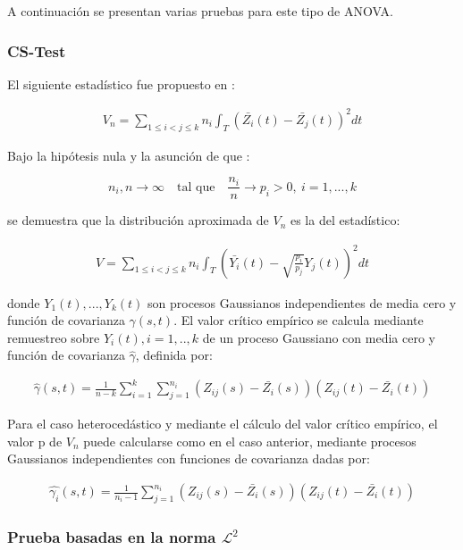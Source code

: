\documentclass[
]{book}
\begin{document}
A continuación se presentan varias pruebas para este tipo de ANOVA.

\hypertarget{cs-test}{%
\subsubsection*{CS-Test}\label{cs-test}}

El siguiente estadístico fue propuesto en \citep{cuevas}:

\begin{align*}
    V_n=\sum_{1\leq i<j\leq k} n_i\int_T (\bar{Z_i}(t)-\bar{Z_j}(t))^2dt
\end{align*}

Bajo la hipótesis nula y la asunción de que :

\begin{equation*}
 n_i,n \to \infty \quad \text{tal que}\quad  \dfrac{n_i}{n}\to p_i >0,\ i=1,...,k
\end{equation*}

se demuestra que la distribución aproximada de \(V_n\) es la del estadístico:

\begin{align*}
    V=\sum_{1\leq i<j\leq k} n_i\int_T \left(\bar{Y_i}(t)-\sqrt{\frac{p_i}{p_j}}Y_j(t)\right)^2dt
\end{align*}

donde \(Y_1(t),...,Y_k(t)\) son procesos Gaussianos independientes de media cero y función de covarianza \(\gamma(s,t)\). El valor crítico empírico se calcula mediante remuestreo sobre \(Y_i(t),i=1,..,k\) de un proceso Gaussiano con media cero y función de covarianza \(\hat{\gamma}\), definida por:

\begin{align*}
    \hat{\gamma}(s,t)=\frac{1}{n-k}\sum_{i=1}^k\sum_{j=1}^{n_i}(Z_{ij}(s)-\bar{Z_i}(s))(Z_{ij}(t)-\bar{Z_i}(t))
\end{align*}

Para el caso heterocedástico y mediante el cálculo del valor crítico empírico, el valor p de \(V_n\) puede calcularse como en el caso anterior, mediante procesos Gaussianos independientes con funciones de covarianza dadas por:

\begin{align*}
    \hat{\gamma_i}(s,t)=\frac{1}{n_i-1}\sum_{j=1}^{n_i}(Z_{ij}(s)-\bar{Z_i}(s))(Z_{ij}(t)-\bar{Z_i}(t))
\end{align*}

\hypertarget{prueba-basadas-en-la-norma-mathcall2}{%
\subsubsection*{\texorpdfstring{Prueba basadas en la norma \(\mathcal{L}^2\)}{Prueba basadas en la norma \textbackslash mathcal\{L\}\^{}2}}\label{prueba-basadas-en-la-norma-mathcall2}}
\end{document}
